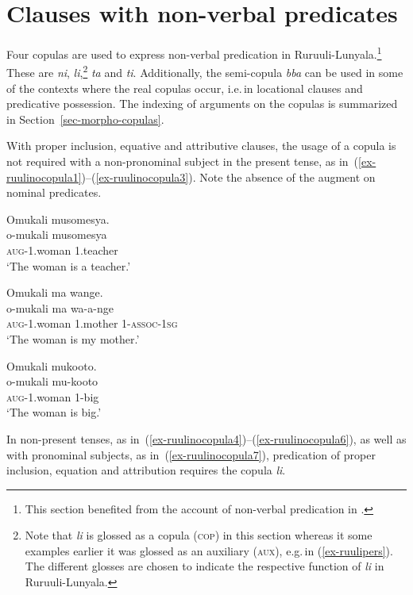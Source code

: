 \section{Clauses with non-verbal predicates}\label{sec-non-verbal-predication}

Four copulas are used to express non-verbal predication in Ruruuli-Lu\-nya\-la.\footnote{This section benefited from the account of non-verbal predication in \citet{Lorenzen2018Nonverbale}.} These are 
\textit{ni}, \textit{li},\footnote{Note that \textit{li} is glossed as a copula (\textsc{cop}) in this section  whereas it some examples earlier it was glossed as an auxiliary (\textsc{aux}), e.g.\,in (\ref{ex-ruulipers}). 
The different glosses are chosen to indicate the respective function of \textit{li} in Ru\-ruu\-li\hyp{}Lu\-nya\-la.} \textit{ta} and \textit{ti}. 
Additionally, the semi-copula \textit{bba} can be used in some of the contexts where the real copulas occur, i.e.\,in locational clauses and predicative possession. 
The indexing of arguments on the copulas is summarized in Section~\ref{sec-morpho-copulas}.

With proper inclusion, equative and attributive clauses, the usage of a copula is not required with a non-pronominal subject in the present tense, as in~(\ref{ex-ruulinocopula1})--(\ref{ex-ruulinocopula3}). 
Note the absence of the augment on nominal predicates.

\ea \label{ex-ruulinonverbal}
\begin{xlist}
	\ex \label{ex-ruulinocopula1}
	\glll Omukali musomesya.\\
		  o-mukali musomesya\\
		\textsc{aug}-1.woman 1.teacher\\
	\glt ‘The woman is a teacher.’ 

\ex\label{ex-ruulinocopula2}
	\glll Omukali ma wange.\\
	  o-mukali ma wa-a-nge\\
		\textsc{aug}-1.woman 1.mother 1-\textsc{assoc}-\textsc{1sg}\\
	\glt ‘The woman is my mother.’ 	

\ex \label{ex-ruulinocopula3}
	\glll Omukali mukooto.\\
		  o-mukali mu-kooto\\
		\textsc{aug}-1.woman 1-big\\
\glt ‘The woman is big.’
\end{xlist}
\z

In non-present tenses, as in~(\ref{ex-ruulinocopula4})--(\ref{ex-ruulinocopula6}), as well as with pronominal subjects, as in~(\ref{ex-ruulinocopula7}), predication of proper inclusion, equation and attribution requires the copula \textit{li}. 

